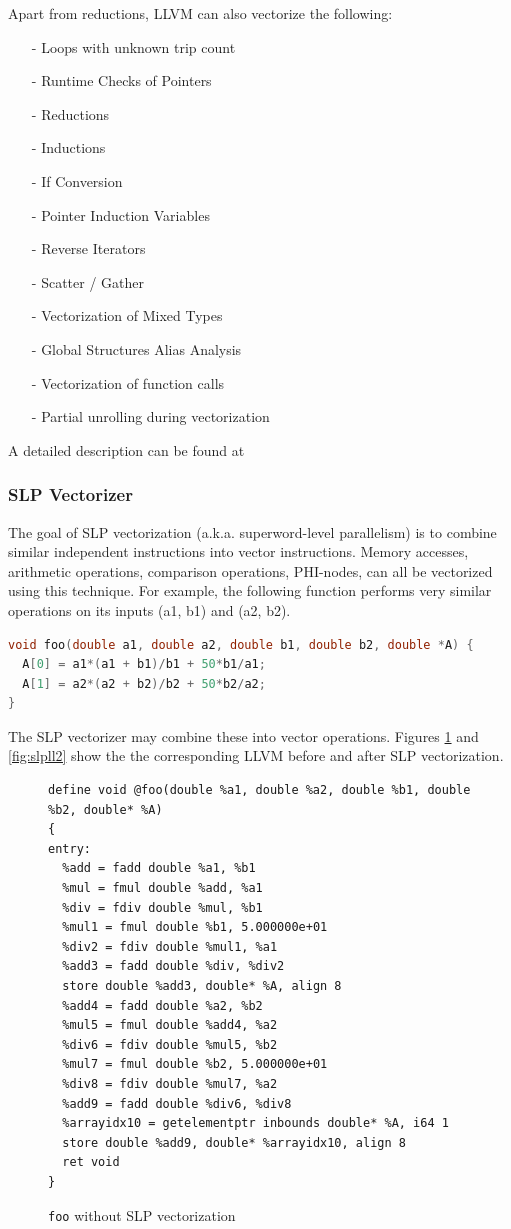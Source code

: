 \documentclass[a4paper,bibliography=totocnumbered,parskip,headsepline]{scrbook}
\begin{document}
Apart from reductions, LLVM can also vectorize the following:
\begin{itemize}[noitemsep]
 \item[-] Loops with unknown trip count
 \item[-] Runtime Checks of Pointers
 \item[-] Reductions
 \item[-] Inductions
 \item[-] If Conversion
 \item[-] Pointer Induction Variables
 \item[-] Reverse Iterators
 \item[-] Scatter / Gather
 \item[-] Vectorization of Mixed Types
 \item[-] Global Structures Alias Analysis
 \item[-] Vectorization of function calls
 \item[-] Partial unrolling during vectorization
\end{itemize}
A detailed description can be found at 

\subsubsection{SLP Vectorizer}
The goal of SLP vectorization (a.k.a. superword-level parallelism) is to combine similar independent instructions into vector instructions.
Memory accesses, arithmetic operations, comparison operations, PHI-nodes, can all be vectorized using this technique.
For example, the following function performs very similar operations on its inputs (a1, b1) and (a2, b2).

\begin{lstlisting}[language=C]
void foo(double a1, double a2, double b1, double b2, double *A) {
  A[0] = a1*(a1 + b1)/b1 + 50*b1/a1;
  A[1] = a2*(a2 + b2)/b2 + 50*b2/a2;
}
\end{lstlisting}

The SLP vectorizer may combine these into vector operations.
Figures \ref{fig:slpll1} and \ref{fig:slpll2} show the the corresponding LLVM before and after SLP vectorization.

\begin{figure}
\begin{lstlisting}
define void @foo(double %a1, double %a2, double %b1, double %b2, double* %A)
{
entry:
  %add = fadd double %a1, %b1
  %mul = fmul double %add, %a1
  %div = fdiv double %mul, %b1
  %mul1 = fmul double %b1, 5.000000e+01
  %div2 = fdiv double %mul1, %a1
  %add3 = fadd double %div, %div2
  store double %add3, double* %A, align 8
  %add4 = fadd double %a2, %b2
  %mul5 = fmul double %add4, %a2
  %div6 = fdiv double %mul5, %b2
  %mul7 = fmul double %b2, 5.000000e+01
  %div8 = fdiv double %mul7, %a2
  %add9 = fadd double %div6, %div8
  %arrayidx10 = getelementptr inbounds double* %A, i64 1
  store double %add9, double* %arrayidx10, align 8
  ret void
}
\end{lstlisting}
\caption{\lstinline{foo} without SLP vectorization}
\label{fig:slpll1}
\end{figure}
\end{document}
